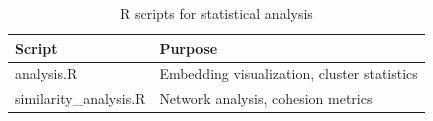 \begin{table}[H]
\centering
\caption{R scripts for statistical analysis}
\begin{tabular}{ll}
\toprule
\textbf{Script} & \textbf{Purpose} \\
\midrule
analysis.R & Embedding visualization, cluster statistics \\
similarity\_analysis.R & Network analysis, cohesion metrics \\
\bottomrule
\end{tabular}
\end{table}
